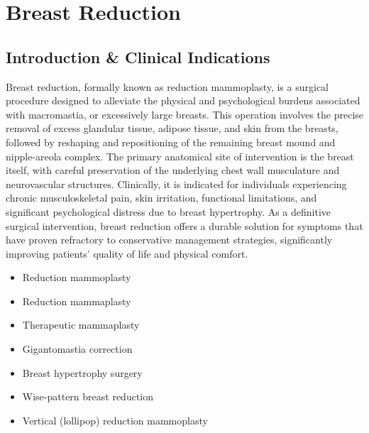 \chapter{Breast Reduction}

\section*{Introduction \& Clinical Indications}
Breast reduction, formally known as reduction mammoplasty, is a surgical procedure designed to alleviate the physical and psychological burdens associated with macromastia, or excessively large breasts. This operation involves the precise removal of excess glandular tissue, adipose tissue, and skin from the breasts, followed by reshaping and repositioning of the remaining breast mound and nipple-areola complex. The primary anatomical site of intervention is the breast itself, with careful preservation of the underlying chest wall musculature and neurovascular structures. Clinically, it is indicated for individuals experiencing chronic musculoskeletal pain, skin irritation, functional limitations, and significant psychological distress due to breast hypertrophy. As a definitive surgical intervention, breast reduction offers a durable solution for symptoms that have proven refractory to conservative management strategies, significantly improving patients' quality of life and physical comfort.

\begin{itemize}
  \item Reduction mammoplasty
  \item Reduction mammaplasty
  \item Therapeutic mammaplasty
  \item Gigantomastia correction
  \item Breast hypertrophy surgery
  \item Wise-pattern breast reduction
  \item Vertical (lollipop) reduction mammoplasty
\end{itemize}

